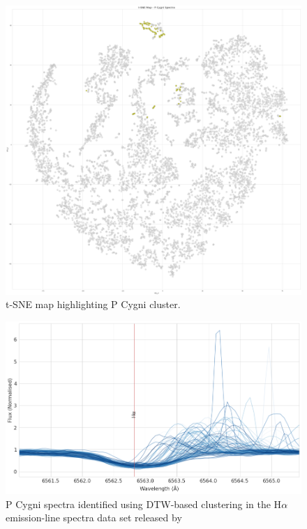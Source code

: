 \begin{figure}[!htb]
\centering
\includegraphics[scale=0.14]{figures/t-sne p cygni only.png}
\caption{t-SNE map highlighting P Cygni cluster.}
\end{figure}

\begin{figure}[!htb]
\centering
\includegraphics[scale=0.45]{figures/pcygni.png}
\caption{P Cygni spectra identified using DTW-based clustering in the H$\alpha$ emission-line spectra data set released by \citet{vcotar2021galah}}
\end{figure}



